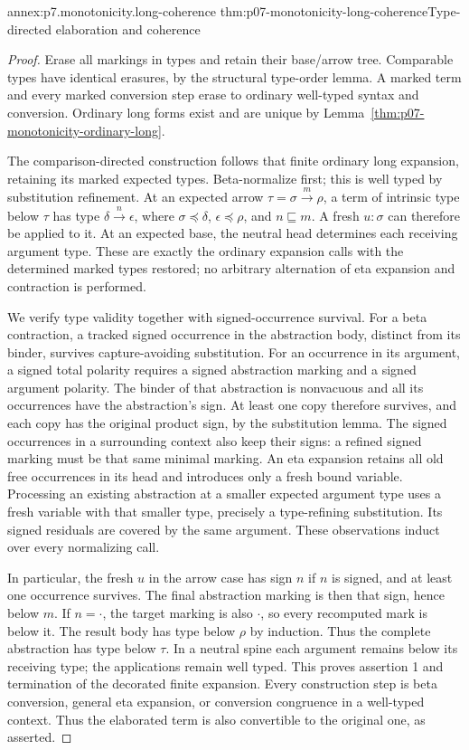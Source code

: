 \begin{annexitem}{annex:p7.monotonicity.long-coherence}
 {thm:p07-monotonicity-long-coherence}{Type-directed elaboration and coherence}
\begin{proof}
Erase all markings in types and retain their base/arrow tree.
Comparable types have identical erasures, by the structural type-order
lemma. A marked term and every marked conversion step erase to ordinary
well-typed syntax and conversion. Ordinary long forms exist and are unique
by Lemma~\ref{thm:p07-monotonicity-ordinary-long}.

The comparison-directed construction follows that finite ordinary long
expansion, retaining its marked expected types.
Beta-normalize first; this is well typed by substitution refinement.
At an expected arrow
\(\tau=\sigma\xrightarrow m\rho\), a term of intrinsic type below
\(\tau\) has type
\(\delta\xrightarrow n\epsilon\), where
\(\sigma\preceq\delta\), \(\epsilon\preceq\rho\), and
\(n\sqsubseteq m\). A fresh \(u:\sigma\) can therefore be applied to
it. At an expected base, the neutral head determines each receiving
argument type. These are exactly the ordinary expansion calls with the
determined marked types restored; no arbitrary alternation of eta
expansion and contraction is performed.

We verify type validity together with signed-occurrence survival.
For a beta contraction, a tracked signed occurrence in the abstraction
body, distinct from its binder, survives capture-avoiding substitution.
For an occurrence in its argument, a signed total polarity requires
a signed abstraction marking and a signed argument polarity.
The binder of that abstraction is nonvacuous and all its occurrences
have the abstraction's sign. At least one copy therefore survives, and
each copy has the original product sign, by the substitution lemma.
The signed occurrences in a surrounding context also keep their signs:
a refined signed marking must be that same minimal marking.
An eta expansion retains all old free occurrences in its head and
introduces only a fresh bound variable.
Processing an existing abstraction at a smaller expected argument type
uses a fresh variable with that smaller type, precisely a type-refining
substitution. Its signed residuals are covered by the same argument.
These observations induct over every normalizing call.

In particular, the fresh \(u\) in the arrow case has sign \(n\) if
\(n\) is signed, and at least one occurrence survives.
The final abstraction marking is then that sign, hence below \(m\).
If \(n=\cdot\), the target marking is also \(\cdot\), so every recomputed
mark is below it. The result body has type below \(\rho\) by induction.
Thus the complete abstraction has type below \(\tau\).
In a neutral spine each argument remains below its receiving type;
the applications remain well typed. This proves assertion 1 and
termination of the decorated finite expansion.
Every construction step is beta conversion, general eta expansion, or
conversion congruence in a well-typed context. Thus the elaborated term
is also convertible to the original one, as asserted.


\end{proof}
\end{annexitem}
